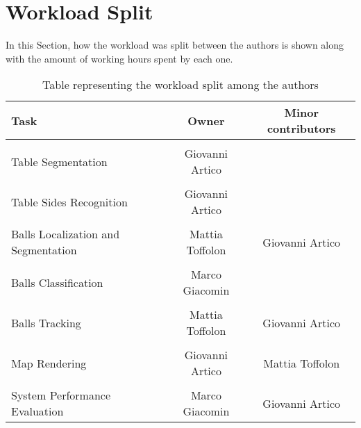 \section{Workload Split}



In this Section, how the workload was split between the authors is shown along with the amount of working hours spent by each one.

\begin{table}[h]
\centering
\begin{tabular}{|l|c|c|}
    \hline
    \textbf{Task} & \textbf{Owner} & \textbf{Minor contributors}  \\ \hline
    \\[-1em]
    Table Segmentation  & Giovanni Artico & \\ \hline
    \\[-1em]
    Table Sides Recognition &  Giovanni Artico & \\ \hline
    \\[-1em]
    Balls Localization and Segmentation & Mattia Toffolon & Giovanni Artico\\ \hline
    \\[-1em]
    Balls Classification & Marco Giacomin & \\ \hline
    \\[-1em]
    Balls Tracking & Mattia Toffolon & Giovanni Artico\\ \hline
    \\[-1em]
    Map Rendering & Giovanni Artico & Mattia Toffolon \\ \hline
    \\[-1em]
    System Performance Evaluation & Marco Giacomin & Giovanni Artico \\ \hline
\end{tabular}
\caption{Table representing the workload split among the authors}
\end{table}

